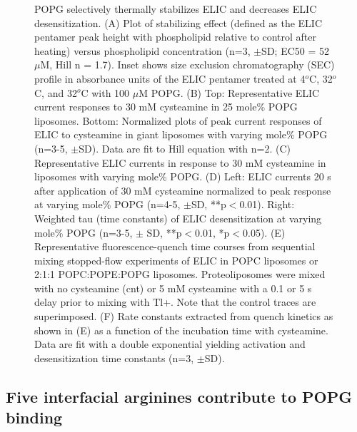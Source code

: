 \begin{figure}   
\caption[POPG selectively thermally stabilizes ELIC and decreases ELIC desensitization.] {POPG selectively thermally stabilizes ELIC and decreases ELIC desensitization. (A) Plot of stabilizing effect (defined as the ELIC pentamer peak height with phospholipid relative to control after heating) versus phospholipid concentration (n=3, $\pm$SD; EC50 = 52 $\mu$M, Hill n = 1.7). Inset shows size exclusion chromatography (SEC) profile in absorbance units of the ELIC pentamer treated at 4$^o$C, 32$^o$C, and 32$^o$C with 100 $\mu$M POPG. (B) Top: Representative ELIC current responses to 30 mM cysteamine in 25 mole\% POPG liposomes. Bottom: Normalized plots of peak current responses of ELIC to cysteamine in giant liposomes with varying mole\% POPG (n=3-5, $\pm$SD). Data are fit to Hill equation with n=2. (C) Representative ELIC currents in response to 30 mM cysteamine in liposomes with varying mole\% POPG. (D) Left: ELIC currents 20 s after application of 30 mM cysteamine normalized to peak response at varying mole\% POPG (n=4-5, $\pm$SD, **p$<$0.01). Right: Weighted tau (time constants) of ELIC desensitization at varying mole\% POPG (n=3-5, $\pm$ SD, **p$<$0.01, *p$<$0.05). (E) Representative fluorescence-quench time courses from sequential mixing stopped-flow experiments of ELIC in POPC liposomes or 2:1:1 POPC:POPE:POPG liposomes. Proteoliposomes were mixed with no cysteamine (cnt) or 5 mM cysteamine with a 0.1 or 5 s delay prior to mixing with Tl+. Note that the control traces are superimposed. (F) Rate constants extracted from quench kinetics as shown in (E) as a function of the incubation time with cysteamine. Data are fit with a double exponential yielding activation and desensitization time constants (n=3, $\pm$SD).} \label{fig:im4}
\end{figure}


\subsection{Five interfacial arginines contribute to POPG binding}

